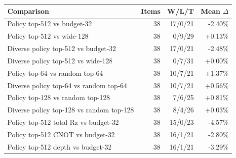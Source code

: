 \begin{tabular}{lrrr}
\toprule
Comparison & Items & W/L/T & Mean $\Delta$ \\
\midrule
Policy top-512 vs budget-32 & 38 & 17/0/21 & -2.40\% \\
Policy top-512 vs wide-128 & 38 & 0/9/29 & +0.13\% \\
Diverse policy top-512 vs budget-32 & 38 & 17/0/21 & -2.48\% \\
Diverse policy top-512 vs wide-128 & 38 & 0/7/31 & +0.00\% \\
Policy top-64 vs random top-64 & 38 & 10/7/21 & +1.37\% \\
Diverse policy top-64 vs random top-64 & 38 & 10/7/21 & +0.56\% \\
Policy top-128 vs random top-128 & 38 & 7/6/25 & +0.81\% \\
Diverse policy top-128 vs random top-128 & 38 & 8/4/26 & +0.03\% \\
Policy top-512 total Rz vs budget-32 & 38 & 15/0/23 & -4.57\% \\
Policy top-512 CNOT vs budget-32 & 38 & 16/1/21 & -2.80\% \\
Policy top-512 depth vs budget-32 & 38 & 16/1/21 & -3.29\% \\
\bottomrule
\end{tabular}

